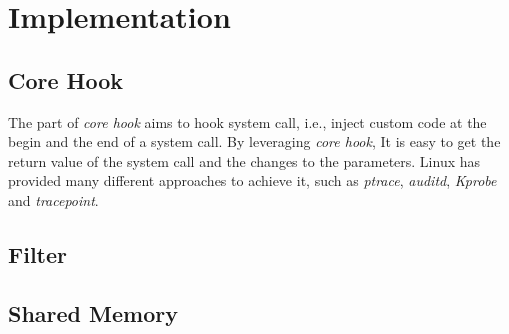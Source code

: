 \section{Implementation}
\subsection{Core Hook}

The part of \textit{core hook} aims to hook system call, i.e., inject custom code at the begin and the end of a system call. By leveraging \textit{core hook}, It is easy to get the return value of the system call and the changes to the parameters. Linux has provided many different approaches to achieve it, such as \textit{ptrace}, \textit{auditd}, \textit{Kprobe} and \textit{tracepoint}. 










\subsection{Filter}

\subsection{Shared Memory}